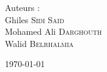 \begin{titlepage}
\begin{center}
    \begin{minipage}{0.9\textwidth}
      \begin{flushleft} \LARGE
        Auteurs :\\
        Ghiles \textsc{Sidi Said}\\
        Mohamed Ali \textsc{Darghouth}\\
        Walid \textsc{Belrhalmia}\\
      \end{flushleft}
    \end{minipage}

    \vfill

    {\LARGE{\today}}

  \end{center}
\end{titlepage}